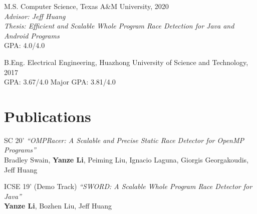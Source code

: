 \documentclass[12pt,letterpaper]{report}
\newcommand{\listtabwidth}{1.75cm}
\begin{document}
	\begin{tablist}
		
		
		\item[M.S.]  \tab Computer Science, Texas A\&M University, 2020 \\
		\textit{Advisor: Jeff Huang}\\
		\textit{Thesis: Efficient and Scalable Whole Program Race Detection for Java and Android Programs}\\
		GPA: 4.0/4.0
		
		\item[B.Eng.]  \tab Electrical Engineering, Huazhong University of Science and Technology, 2017 \\
		GPA: 3.67/4.0 \hspace{0.5cm} Major GPA: 3.81/4.0
				
	\end{tablist}


	


	\section*{Publications}
	\begin{tablist}
		 \item[SC 20'] \tab \textit{\enquote{OMPRacer: A Scalable and Precise Static Race Detector for OpenMP Programs}}\\
		 		           Bradley Swain, \textbf{Yanze Li}, Peiming Liu, Ignacio Laguna, Giorgis Georgakoudis, Jeff Huang
		\item[ICSE 19'] \tab (Demo Track) \textit{\enquote{SWORD: A Scalable Whole Program Race Detector for Java}} \\
							 \textbf{Yanze Li}, Bozhen Liu, Jeff Huang
	\end{tablist}

\renewcommand{\listtabwidth}{2.5cm}
\end{document}
